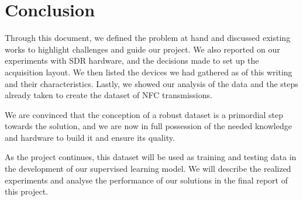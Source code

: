 \section{Conclusion}

Through this document, we defined the problem at hand and discussed existing works to highlight challenges and guide our project. We also reported on our experiments with SDR hardware, and the decisions made to set up the acquisition layout. We then listed the devices we had gathered as of this writing and their characteristics. Lastly, we showed our analysis of the data and the steps already taken to create the dataset of NFC transmissions.

We are convinced that the conception of a robust dataset is a primordial step towards the solution, and we are now in full possession of the needed knowledge and hardware to build it and ensure its quality.

As the project continues, this dataset will be used as training and testing data in the development of our supervised learning model. We will describe the realized experiments and analyse the performance of our solutions in the final report of this project.
